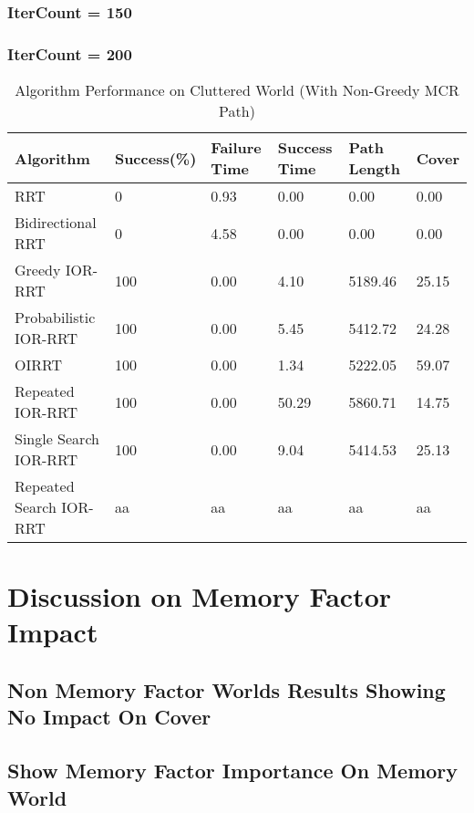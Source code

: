 \subsubsection{IterCount = 150}
\subsubsection{IterCount = 200}
\begin{table}
\begin{tabular}{@{}llllll@{}}
\toprule
Algorithm & Success(\%)  & Failure Time  & Success Time  & Path Length & Cover\\ 
\midrule
RRT & 0 & 0.93 & 0.00 & 0.00 & 0.00 \\
Bidirectional RRT & 0 & 4.58 & 0.00 & 0.00 & 0.00 \\
Greedy IOR-RRT & 100 & 0.00 & 4.10 & 5189.46 & 25.15 \\
Probabilistic IOR-RRT & 100 & 0.00 & 5.45 & 5412.72 & 24.28 \\
OIRRT & 100 & 0.00 & 1.34 & 5222.05 & 59.07 \\
Repeated IOR-RRT & 100 & 0.00 & 50.29 & 5860.71 & 14.75 \\
Single Search IOR-RRT & 100 & 0.00 & 9.04 & 5414.53 & 25.13 \\
Repeated Search IOR-RRT & aa & aa & aa & aa & aa \\
\bottomrule
\end{tabular}
\caption{Algorithm Performance on Cluttered World (With Non-Greedy MCR Path)}
\label{tab:top_light_cluttered_world}
\end{table}

\section{Discussion on Memory Factor Impact}
\subsection{Non Memory Factor Worlds Results Showing No Impact On Cover}
\subsection{Show Memory Factor Importance On Memory World}







